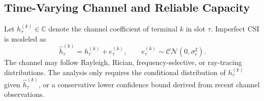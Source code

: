 \documentclass[journal]{IEEEtran}
\begin{document}
\subsection{Time-Varying Channel and Reliable Capacity}

Let $h_{\tau}^{(k)}\in\mathbb C$ denote the channel coefficient of terminal $k$ in slot $\tau$. Imperfect CSI is modeled as
\begin{equation}
\widehat h_{\tau}^{(k)}=h_{\tau}^{(k)}+e_{\tau}^{(k)},
\qquad
e_{\tau}^{(k)}\sim\mathcal{CN}(0,\sigma_e^2).
\label{eq:csi}
\end{equation}
The channel may follow Rayleigh, Rician, frequency-selective, or ray-tracing distributions. The analysis only requires the conditional distribution of $h_{\tau}^{(k)}$ given $\widehat h_{\tau}^{(k)}$, or a conservative lower confidence bound derived from recent channel observations.
\end{document}
